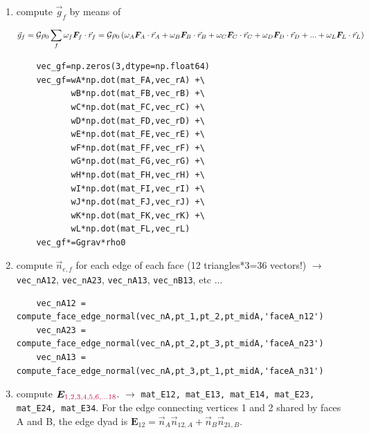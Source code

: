\begin{enumerate}
\item compute $\vec{g}_f$ by means of %

\[
\vec{g}_f
= {\cal G} \rho_0 \sum_f \omega_f {\bm F}_f\cdot \vec{r}_f 
= {\cal G} \rho_0 \left(
\omega_A {\bm F}_A\cdot \vec{r}_A +
\omega_B {\bm F}_B\cdot \vec{r}_B +
\omega_C {\bm F}_C\cdot \vec{r}_C +
\omega_D {\bm F}_D\cdot \vec{r}_D +
...+
\omega_L {\bm F}_L \cdot \vec{r}_L
\right)
\]

{\tiny
\begin{lstlisting}
    vec_gf=np.zeros(3,dtype=np.float64)
    vec_gf=wA*np.dot(mat_FA,vec_rA) +\
           wB*np.dot(mat_FB,vec_rB) +\
           wC*np.dot(mat_FC,vec_rC) +\
           wD*np.dot(mat_FD,vec_rD) +\
           wE*np.dot(mat_FE,vec_rE) +\
           wF*np.dot(mat_FF,vec_rF) +\
           wG*np.dot(mat_FG,vec_rG) +\
           wH*np.dot(mat_FH,vec_rH) +\
           wI*np.dot(mat_FI,vec_rI) +\
           wJ*np.dot(mat_FJ,vec_rJ) +\
           wK*np.dot(mat_FK,vec_rK) +\
           wL*np.dot(mat_FL,vec_rL)
    vec_gf*=Ggrav*rho0
\end{lstlisting}
}


\item compute $\vec{n}_{e,f}$ for each edge of each face (12 triangles*3=36 vectors!)
$\rightarrow$ \verb|vec_nA12|, \verb|vec_nA23|, \verb|vec_nA13|, \verb|vec_nB13|, etc ...

{\tiny
\begin{lstlisting}
    vec_nA12 = compute_face_edge_normal(vec_nA,pt_1,pt_2,pt_midA,'faceA_n12')
    vec_nA23 = compute_face_edge_normal(vec_nA,pt_2,pt_3,pt_midA,'faceA_n23')
    vec_nA13 = compute_face_edge_normal(vec_nA,pt_3,pt_1,pt_midA,'faceA_n31')
\end{lstlisting}
}




\item compute ${\bm E}_{\color{purple} 1,2,3,4,5,6,...18}$.
$\rightarrow$ \verb|mat_E12, mat_E13, mat_E14, mat_E23, mat_E24, mat_E34|.
For the edge connecting vertices 1 and 2 shared by faces A and B,
the edge dyad is ${\bm E}_{12}=\vec{n}_A \vec{n}_{12,A}+\vec{n}_B \vec{n}_{21,B}$.



\end{enumerate}
